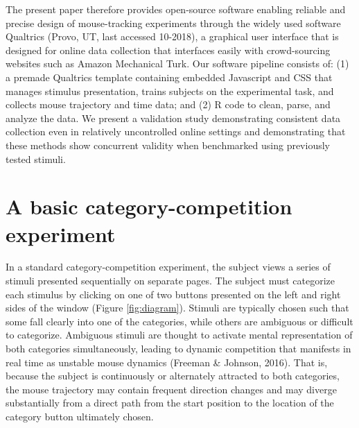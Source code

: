 \documentclass[]{article}
\begin{document}
The present paper therefore provides open-source software enabling
reliable and precise design of mouse-tracking experiments through the
widely used software Qualtrics (Provo, UT, last accessed 10-2018), a
graphical user interface that is designed for online data collection
that interfaces easily with crowd-sourcing websites such as Amazon
Mechanical Turk. Our software pipeline consists of: (1) a premade
Qualtrics template containing embedded Javascript and CSS that manages
stimulus presentation, trains subjects on the experimental task, and
collects mouse trajectory and time data; and (2) R code to clean, parse,
and analyze the data. We present a validation study demonstrating
consistent data collection even in relatively uncontrolled online
settings and demonstrating that these methods show concurrent validity
when benchmarked using previously tested stimuli.

\section{A basic category-competition experiment}
\label{sec:basic_expt}

In a standard category-competition experiment, the subject views a
series of stimuli presented sequentially on separate pages. The subject
must categorize each stimulus by clicking on one of two buttons
presented on the left and right sides of the window (Figure
\ref{fig:diagram}). Stimuli are typically chosen such that some fall
clearly into one of the categories, while others are ambiguous or
difficult to categorize. Ambiguous stimuli are thought to activate
mental representation of both categories simultaneously, leading to
dynamic competition that manifests in real time as unstable mouse
dynamics (Freeman \& Johnson, 2016). That is, because the subject is
continuously or alternately attracted to both categories, the mouse
trajectory may contain frequent direction changes and may diverge
substantially from a direct path from the start position to the location
of the category button ultimately chosen.
\end{document}
